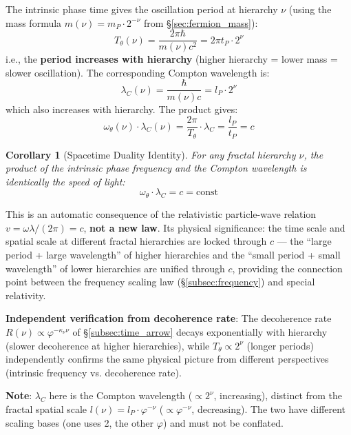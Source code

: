\documentclass[12pt,a4paper,twocolumn]{article}
\renewcommand{\phi}{\varphi}
\newtheorem{corollary}[theorem]{Corollary}
\begin{document}
The intrinsic phase time gives the oscillation period at hierarchy $\nu$ (using the mass formula $m(\nu) = m_P \cdot 2^{-\nu}$ from \S\ref{sec:fermion_mass}):
\begin{equation}
T_\theta(\nu) = \frac{2\pi\hbar}{m(\nu)c^2} = 2\pi t_P \cdot 2^{\nu}
\end{equation}
i.e., the \textbf{period increases with hierarchy} (higher hierarchy = lower mass = slower oscillation). The corresponding Compton wavelength is:
\begin{equation}
\lambda_C(\nu) = \frac{\hbar}{m(\nu)c} = l_P \cdot 2^{\nu}
\end{equation}
which also increases with hierarchy. The product gives:
\begin{equation}
\omega_\theta(\nu) \cdot \lambda_C(\nu) = \frac{2\pi}{T_\theta} \cdot \lambda_C = \frac{l_P}{t_P} = c
\end{equation}

\begin{corollary}[Spacetime Duality Identity]
\label{cor:spacetime_duality}
For any fractal hierarchy $\nu$, the product of the intrinsic phase frequency and the Compton wavelength is identically the speed of light:
\begin{equation}
\omega_\theta \cdot \lambda_C = c = \text{const}
\end{equation}
\end{corollary}

This is an automatic consequence of the relativistic particle-wave relation $v = \omega\lambda/(2\pi) = c$, \textbf{not a new law}. Its physical significance: the time scale and spatial scale at different fractal hierarchies are locked through $c$ --- the ``large period + large wavelength'' of higher hierarchies and the ``small period + small wavelength'' of lower hierarchies are unified through $c$, providing the connection point between the frequency scaling law (\S\ref{subsec:frequency}) and special relativity.

\textbf{Independent verification from decoherence rate}: The decoherence rate $R(\nu) \propto \phi^{-\kappa_\nu\nu}$ of \S\ref{subsec:time_arrow} decays exponentially with hierarchy (slower decoherence at higher hierarchies), while $T_\theta \propto 2^{\nu}$ (longer periods) independently confirms the same physical picture from different perspectives (intrinsic frequency vs. decoherence rate).

\textbf{Note}: $\lambda_C$ here is the Compton wavelength ($\propto 2^{\nu}$, increasing), distinct from the fractal spatial scale $l(\nu) = l_P \cdot \phi^{-\nu}$ ($\propto \phi^{-\nu}$, decreasing). The two have different scaling bases (one uses 2, the other $\phi$) and must not be conflated.
\end{document}

